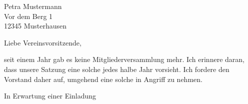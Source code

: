 \documentclass[ngerman,%
]{tudscrreprt}
\begin{document}
\renewcommand*\letterpagestyle{plain.tudheadings}
\begin{letter}{%
Petra Mustermann\\
Vor dem Berg 1\\
12345 Musterhausen%
}
\opening{Liebe Vereinsvorsitzende,}
\thispagestyle{empty.tudheadings}
seit einem Jahr gab es keine Mitgliederversammlung
mehr. Ich erinnere daran, dass unsere Satzung eine
solche jedes halbe Jahr vorsieht. Ich fordere den
Vorstand daher auf, umgehend eine solche in
Angriff zu nehmen.

\blindtext
\blindtext
\blindtext
\closing{In Erwartung einer Einladung}
\end{letter}
\end{document}
